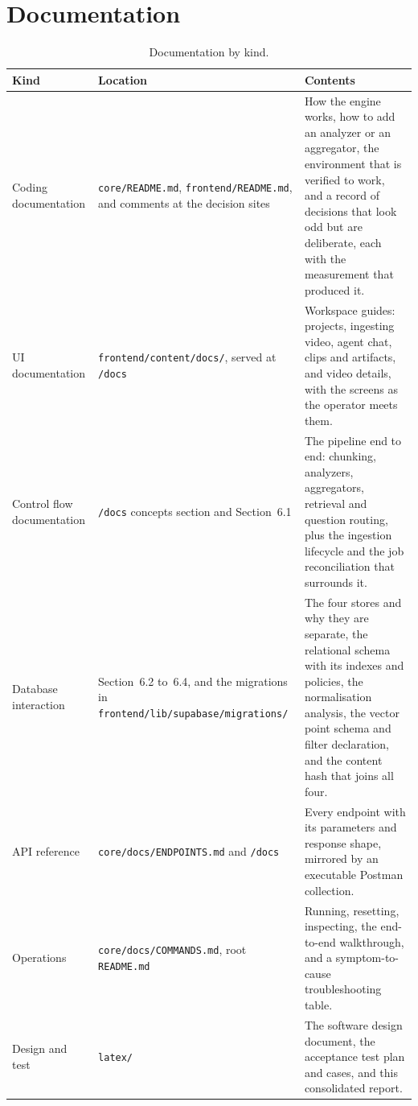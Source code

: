 \documentclass[11pt,a4paper]{article}
\begin{document}
\section{Documentation}

\begin{table}[htbp]
\centering
\small
\begin{tabularx}{\textwidth}{@{}L{2.6cm}L{2.9cm}X@{}}
\toprule
\textbf{Kind} & \textbf{Location} & \textbf{Contents} \\
\midrule
Coding documentation &
\texttt{core/README.md}, \texttt{frontend/}\allowbreak\texttt{README.md}, and
comments at the decision sites & How the engine works, how to add an analyzer or an aggregator, the environment that is verified to work, and a record of decisions that look odd but are deliberate, each with the measurement that produced it. \\
UI documentation & \texttt{frontend/content/docs/}, served at \texttt{/docs} & Workspace guides: projects, ingesting video, agent chat, clips and artifacts, and video details, with the screens as the operator meets them. \\
Control flow documentation & \texttt{/docs} concepts section and Section~6.1 & The pipeline end to end: chunking, analyzers, aggregators, retrieval and question routing, plus the ingestion lifecycle and the job reconciliation that surrounds it. \\
Database interaction & Section~6.2 to~6.4, and the migrations in
\texttt{frontend/}\allowbreak\texttt{lib/supabase/}\allowbreak\texttt{migrations/} & The four stores and why they are separate, the relational schema with its indexes and policies, the normalisation analysis, the vector point schema and filter declaration, and the content hash that joins all four. \\
API reference & \texttt{core/docs/}\allowbreak\texttt{ENDPOINTS.md} and \texttt{/docs} & Every endpoint with its parameters and response shape, mirrored by an executable Postman collection. \\
Operations & \texttt{core/docs/}\allowbreak\texttt{COMMANDS.md}, root \texttt{README.md} & Running, resetting, inspecting, the end-to-end walkthrough, and a symptom-to-cause troubleshooting table. \\
Design and test & \texttt{latex/} & The software design document, the acceptance test plan and cases, and this consolidated report. \\
\bottomrule
\end{tabularx}
\caption{Documentation by kind.}
\end{table}
\end{document}
